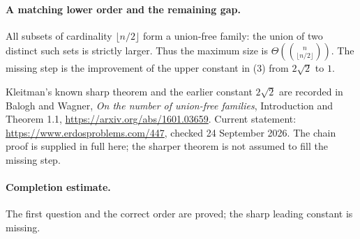 \paragraph{A matching lower order and the remaining gap.}
All subsets of cardinality \(\lfloor n/2\rfloor\) form a union-free
family: the union of two distinct such sets is strictly larger.
Thus the maximum size is \(\Theta(\binom n{\lfloor n/2\rfloor})\).
The missing step is the improvement of the upper constant in (3)
from \(2\sqrt2\) to \(1\).

Kleitman's known sharp theorem and the earlier constant \(2\sqrt2\)
are recorded in Balogh and Wagner, \emph{On the number of union-free
families}, Introduction and Theorem 1.1,
\url{https://arxiv.org/abs/1601.03659}.
Current statement: \url{https://www.erdosproblems.com/447},
checked 24 September 2026. The chain proof is supplied in full here;
the sharper theorem is not assumed to fill the missing step.

\paragraph{Completion estimate.}
The first question and the correct order are proved; the sharp leading constant is missing.
